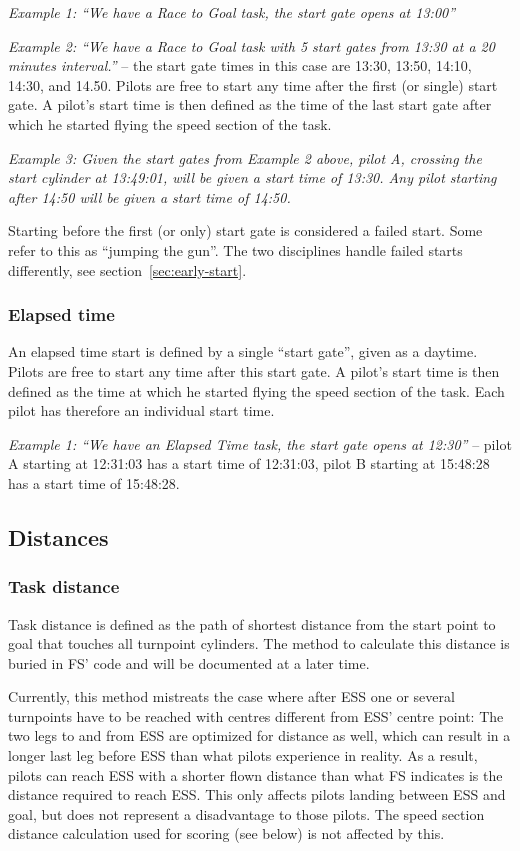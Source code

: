 \documentclass{article}
\begin{document}
\textit{Example 1: “We have a Race to Goal task, the start gate opens at 13:00”}

\textit{Example 2: “We have a Race to Goal task with 5 start gates from 13:30 at a 20
minutes interval.”} – the start gate times in this case are 13:30, 13:50, 14:10,
14:30, and 14.50.  Pilots are free to start any time after the first (or
single) start gate. A pilot’s start time is then defined as the time of the
last start gate after which he started flying the speed section of the task.

\textit{Example 3: Given the start gates from Example 2 above, pilot A, crossing the
start cylinder at 13:49:01, will be given a start time of 13:30. Any pilot
starting after 14:50 will be given a start time of 14:50.}

Starting before the first (or only) start gate is considered a failed start.
Some refer to this as “jumping the gun”. The two disciplines handle failed
starts differently, see section~\ref{sec:early-start}.

\subsubsection{Elapsed time}
An elapsed time start is defined by a single “start gate”, given as a daytime.
Pilots are free to start any time after this start gate. A pilot’s start time
is then defined as the time at which he started flying the speed section of the
task. Each pilot has therefore an individual start time.

\textit{Example 1: “We have an Elapsed Time task, the start gate opens at 12:30”}
– pilot A starting at 12:31:03 has a start time of 12:31:03, pilot B starting
at 15:48:28 has a start time of 15:48:28.

\subsection{Distances}
\subsubsection{Task distance}
\label{sec:task-distance}
Task distance is defined as the path of shortest distance from the start point
to goal that touches all turnpoint cylinders. The method to calculate this
distance is buried in FS’ code and will be documented at a later time.

Currently, this method mistreats the case where after ESS one or several
turnpoints have to be reached with centres different from ESS’ centre point:
The two legs to and from ESS are optimized for distance as well, which can
result in a longer last leg before ESS than what pilots experience in reality.
As a result, pilots can reach ESS with a shorter flown distance than what FS
indicates is the distance required to reach ESS. This only affects pilots
landing between ESS and goal, but does not represent a disadvantage to those
pilots. The speed section distance calculation used for scoring (see below) is
not affected by this.
\end{document}
